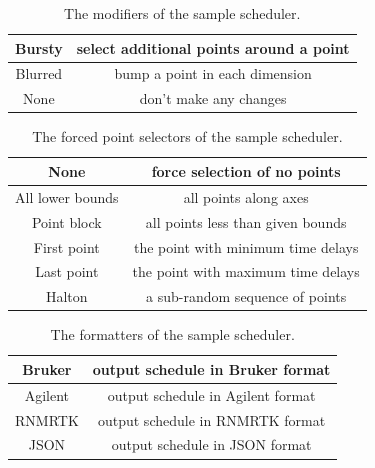 \begin{table}[h]
  \begin{tabular}{ | c | c | }
    \hline
    Bursty    &  select additional points around a point  \\  \hline
    Blurred   &  bump a point in each dimension   \\  \hline
    None      &  don't make any changes           \\  \hline
  \end{tabular}
  \caption{The modifiers of the sample scheduler.}
  \label{scheduler_modifiers}
\end{table}

\begin{table}[h]
  \begin{tabular}{ | c | c | }
    \hline
    None                &  force selection of no points         \\  \hline
    All lower bounds    &  all points along axes                \\  \hline
    Point block         &  all points less than given bounds    \\  \hline
    First point         &  the point with minimum time delays   \\  \hline
    Last point          &  the point with maximum time delays   \\  \hline
    Halton              &  a sub-random sequence of points      \\  \hline
  \end{tabular}
  \caption{The forced point selectors of the sample scheduler.}
  \label{scheduler_forced_point_selectors}
\end{table}

\begin{table}[h]
  \begin{tabular}{ | c | c | }
    \hline
    Bruker      &  output schedule in Bruker format  \\  \hline
    Agilent     &  output schedule in Agilent format  \\  \hline
    RNMRTK      &  output schedule in RNMRTK format  \\  \hline
    JSON      &  output schedule in JSON format  \\  \hline
  \end{tabular}
  \caption{The formatters of the sample scheduler.}
  \label{scheduler_formatters}
\end{table}



\clearpage

